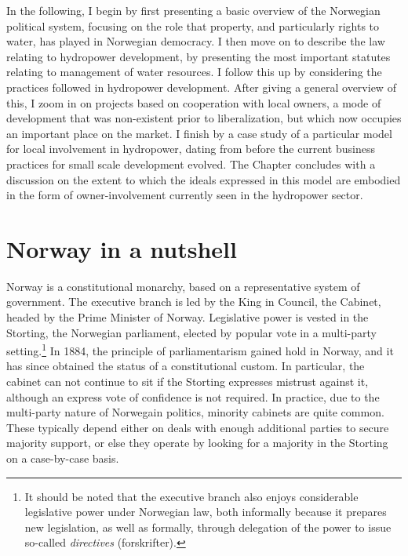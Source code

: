 In the following, I begin by first presenting a basic overview of the Norwegian political system, focusing on the role that property, and particularly rights to water, has played in Norwegian democracy. I then move on to describe the law relating to hydropower development, by presenting the most important statutes relating to management of water resources. I follow this up by considering the practices followed in hydropower development. After giving a general overview of this, I zoom in on projects based on cooperation with local owners, a mode of development that was non-existent prior to liberalization, but which now occupies an important place on the market. I finish by a case study of a particular model for local involvement in hydropower, dating from before the current business practices for small scale development evolved. The Chapter concludes with a discussion on the extent to which the ideals expressed in this model are embodied in the form of owner-involvement currently seen in the hydropower sector.

\section{Norway in a nutshell}\label{sec:nutshell}

Norway is a constitutional monarchy, based on a representative system of government. The executive branch is led by the King in Council, the Cabinet, headed by the Prime Minister of Norway. Legislative power is vested in the Storting, the Norwegian parliament, elected by popular vote in a multi-party setting.\footnote{It should be noted that the executive branch also enjoys considerable legislative power under Norwegian law, both informally because it prepares new legislation, as well as formally, through delegation of the power to issue so-called {\it directives} (forskrifter).} In 1884, the principle of parliamentarism gained hold in Norway, and it has since obtained the status of a constitutional custom. In particular, the cabinet can not continue to sit if the Storting expresses mistrust against it, although an express vote of confidence is not required. In practice, due to the multi-party nature of Norwegain politics, minority cabinets are quite common. These typically depend either on deals with enough additional parties to secure majority support, or else they operate by looking for a majority in the Storting on a case-by-case basis.

